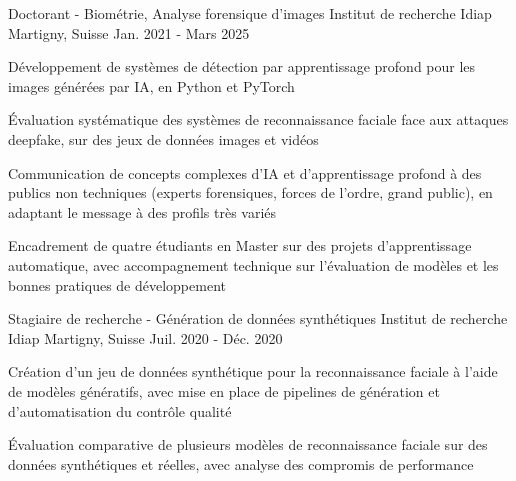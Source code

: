 \begin{cventries}
  \cventry
    {Doctorant - Biométrie, Analyse forensique d'images} %
    {Institut de recherche Idiap} %
    {Martigny, Suisse} %
    {Jan. 2021 - Mars 2025} %
    {
      \begin{cvitems} %
        \item {Développement de systèmes de détection par apprentissage profond pour les images générées par IA, en Python et PyTorch}
        \item {Évaluation systématique des systèmes de reconnaissance faciale face aux attaques deepfake, sur des jeux de données images et vidéos}
        \item {Communication de concepts complexes d'IA et d'apprentissage profond à des publics non techniques (experts forensiques, forces de l'ordre, grand public), en adaptant le message à des profils très variés}
        \item {Encadrement de quatre étudiants en Master sur des projets d'apprentissage automatique, avec accompagnement technique sur l'évaluation de modèles et les bonnes pratiques de développement}
      \end{cvitems}
    }

  \cventry
    {Stagiaire de recherche - Génération de données synthétiques} %
    {Institut de recherche Idiap} %
    {Martigny, Suisse} %
    {Juil. 2020 - Déc. 2020} %
    {
      \begin{cvitems} %
        \item {Création d'un jeu de données synthétique pour la reconnaissance faciale à l'aide de modèles génératifs, avec mise en place de pipelines de génération et d'automatisation du contrôle qualité}
        \item {Évaluation comparative de plusieurs modèles de reconnaissance faciale sur des données synthétiques et réelles, avec analyse des compromis de performance}
      \end{cvitems}
    }


\end{cventries}
